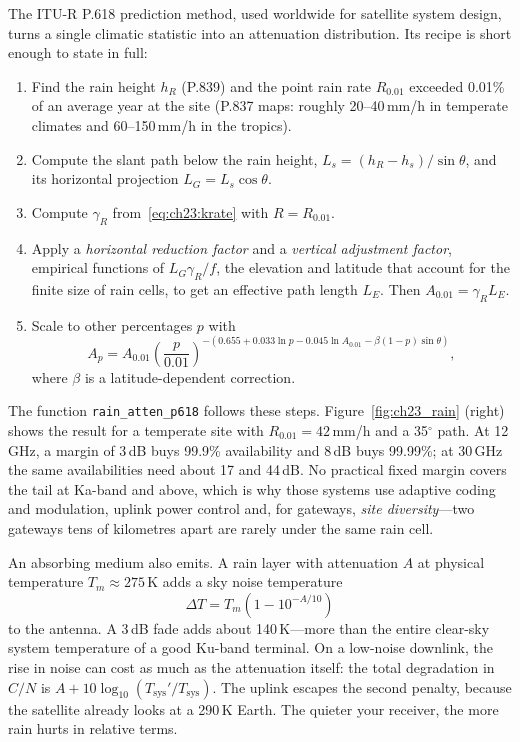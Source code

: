 The ITU-R P.618 prediction method, used worldwide for satellite system design, turns a single
climatic statistic into an attenuation distribution. Its recipe is short enough to state in full:
\begin{enumerate}
\item Find the rain height $h_R$ (P.839) and the point rain rate $R_{0.01}$ exceeded 0.01\% of an
average year at the site (P.837 maps: roughly 20--40\,mm/h in temperate climates and 60--150\,mm/h
in the tropics).
\item Compute the slant path below the rain height, $L_s=(h_R-h_s)/\sin\theta$, and its horizontal
projection $L_G=L_s\cos\theta$.
\item Compute $\gamma_R$ from~\eqref{eq:ch23:krate} with $R=R_{0.01}$.
\item Apply a \emph{horizontal reduction factor} and a \emph{vertical adjustment factor}, empirical
functions of $L_G\gamma_R/f$, the elevation and latitude that account for the finite size of rain
cells, to get an effective path length $L_E$. Then $A_{0.01}=\gamma_RL_E$.
\item Scale to other percentages $p$ with
\[
A_p=A_{0.01}\left(\frac{p}{0.01}\right)^{-(0.655+0.033\ln p-0.045\ln A_{0.01}-\beta(1-p)\sin\theta)},
\]
where $\beta$ is a latitude-dependent correction.
\end{enumerate}
The function \texttt{rain\_atten\_p618} follows these steps. Figure~\ref{fig:ch23_rain} (right)
shows the result for a temperate site with $R_{0.01}=42$\,mm/h and a 35$^\circ$ path. At
12\,GHz, a margin of 3\,dB buys 99.9\% availability and 8\,dB buys 99.99\%; at 30\,GHz the same
availabilities need about 17 and 44\,dB. No practical fixed margin covers the tail at Ka-band and
above, which is why those systems use adaptive coding and modulation, uplink power control and,
for gateways, \emph{site diversity}---two gateways tens of kilometres apart are rarely under the
same rain cell.


\begin{keyidea}
An absorbing medium also emits. A rain layer with attenuation $A$ at physical temperature
$T_m\approx275$\,K adds a sky noise temperature
\begin{equation}
\Delta T=T_m\left(1-10^{-A/10}\right)
\label{eq:ch23:rainnoise}
\end{equation}
to the antenna. A 3\,dB fade adds about 140\,K---more than the entire clear-sky system
temperature of a good Ku-band terminal. On a low-noise downlink, the rise in noise can cost as
much as the attenuation itself: the total degradation in $C/N$ is $A+10\log_{10}(T_{\text{sys}}'/T_{\text{sys}})$.
The uplink escapes the second penalty, because the satellite already looks at a 290\,K Earth. The
quieter your receiver, the more rain hurts in relative terms.
\end{keyidea}

